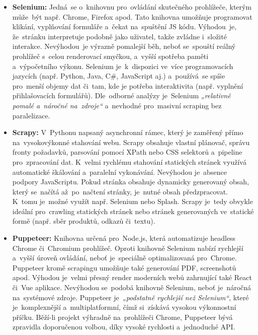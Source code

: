 \begin{itemize}
    \item \textbf{Selenium:} Jedná~se o~knihovnu pro~ovládání skutečného
        prohlížeče, kterým může~být např. Chrome, Firefox apod. Tato knihovna
        umožňuje programovat klikání, vyplňování formuláře a~čekat na~spuštění
        JS kódu. Výhodou~je, že~stránku interpretuje podobně jako uživatel,
        takže zvládne i~složité interakce. Nevýhodou~je výrazně pomalejší
        běh, neboť se~spouští reálný prohlížeč s~celou renderovací smyčkou,
        a~vyšší spotřeba paměti a~výpočetního výkonu. Selenium je~k~dispozici
        ve~více programovacích jazycích (např. Python, Java, C\#, JavaScript
        aj.) a~používá~se spíše pro~menší objemy dat či~tam, kde je potřeba
        interaktivita (např. vyplnění přihlašovacích formulářů). Dle~odborné
        analýzy je~Selenium \emph{„relativně pomalé a~náročné na~zdroje“}
        a~nevhodné pro~masivní scraping bez paralelizace.
        \cite{YHVfLHsNlUItkF6G,XDjScR8U0lQdUngn} %
    \item \textbf{Scrapy:} V~Pythonu napsaný asynchronní rámec, který
        je zaměřený přímo na~vysokovýkonné stahování webu. Scrapy obsahuje
        vlastní plánovač, správu fronty požadavků, parsování pomocí XPath
        nebo CSS selektorů a~pipeline pro~zpracování dat. K~velmi rychlému
        stahování statických stránek využívá automatické škálování
        a~paralelní vykonávání. Nevýhodou je~absence podpory JavaScriptu.
        Pokud stránka obsahuje dynamicky generovaný obsah, který se~načítá
        až~po~načtení stránky, je~nutné obsah předzpracovat. K~tomu je~možné
        využít např. Selenium nebo Splash. Scrapy je~tedy obvykle ideální
        pro~crawling statických stránek nebo stránek generovaných ve~statické
        formě (např. sběr produktů, odkazů či~textu).
        \cite{YHVfLHsNlUItkF6G,XDjScR8U0lQdUngn} %
    \item \textbf{Puppeteer:} Knihovna určená pro~Node.js, která automatizuje
        headless Chrome či~Chromium prohlížeč. Oproti knihovně Selenium
        nabízí rychlejší a~vyšší úroveň ovládání, neboť je~speciálně
        optimalizovaná pro~Chrome. Puppeteer kromě scrapingu umožňuje také
        generování PDF, screenshotů apod. Výhodou je~velmi přesný render
        moderních webů zahrnující také React či~Vue aplikace. Nevýhodou
        se~podobá knihovně Selenium, neboť je~náročná na~systémové zdroje.
        Puppeteer je~\emph{„podstatně rychlejší než Selenium“}, které
        je~komplexnější a~multiplatformní, čímž si~získává vysokou
        výkonnostní příčku. Běží-li projekt výhradně na~prohlížeči Chrome,
        Puppeteer bývá zpravidla doporučenou volbou, díky vysoké rychlosti
        a~jednoduché API. \cite{YHVfLHsNlUItkF6G,KVcwMBKpAmczm8Mo}
\end{itemize}

